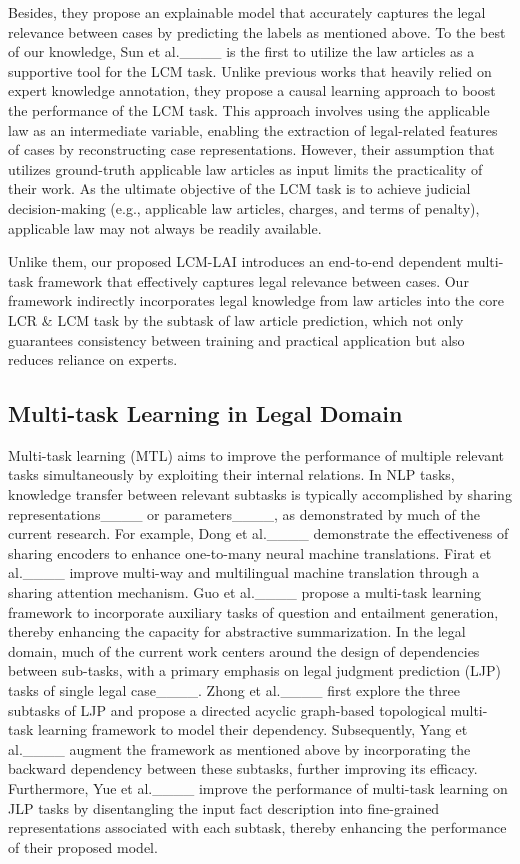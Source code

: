 Besides, they propose an explainable model that accurately captures the legal relevance between cases by predicting the labels as mentioned above.
To the best of our knowledge, Sun et al.____ is the first to utilize the law articles as a supportive tool for the LCM task.
Unlike previous works that heavily relied on expert knowledge annotation, they propose a causal learning approach to boost the performance of the LCM task. 
This approach involves using the applicable law as an intermediate variable, enabling the extraction of legal-related features of cases by reconstructing case representations.
However, their assumption that utilizes ground-truth applicable law articles as input limits the practicality of their work. 
As the ultimate objective of the LCM task is to achieve judicial decision-making (e.g., applicable law articles, charges, and terms of penalty), applicable law may not always be readily available.

Unlike them, our proposed LCM-LAI introduces an end-to-end dependent multi-task framework that effectively captures legal relevance between cases.
Our framework indirectly incorporates legal knowledge from law articles into the core LCR \& LCM task by the subtask of law article prediction, which not only guarantees consistency between training and practical application but also reduces reliance on experts.


\subsection{Multi-task Learning in Legal Domain}
Multi-task learning (MTL) aims to improve the performance of multiple relevant tasks simultaneously by exploiting their internal relations.
In NLP tasks, knowledge transfer between relevant subtasks is typically accomplished by sharing representations____ or parameters____, as demonstrated by much of the current research.
For example, Dong et al.____ demonstrate the effectiveness of sharing encoders to enhance one-to-many neural machine translations.
Firat et al.____ improve multi-way and multilingual machine translation through a sharing attention mechanism.
Guo et al.____ propose a multi-task learning framework to incorporate auxiliary tasks of question and entailment generation, thereby enhancing the capacity for abstractive summarization.
In the legal domain, much of the current work centers around the design of dependencies between sub-tasks, with a primary emphasis on legal judgment prediction (LJP) tasks of single legal case____.
Zhong et al.____ first explore the three subtasks of LJP and propose a directed acyclic graph-based topological multi-task learning framework to model their dependency.
Subsequently, Yang et al.____ augment the framework as mentioned above by incorporating the backward dependency between these subtasks, further improving its efficacy.
Furthermore, Yue et al.____ improve the performance of multi-task learning on JLP tasks by disentangling the input fact description into fine-grained representations associated with each subtask, thereby enhancing the performance of their proposed model.

